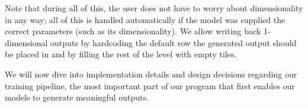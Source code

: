 Note that during all of this, the user does not have to worry about
dimensionality in any way; all of this is handled automatically if the
model was supplied the correct parameters (such as its
dimensionality). We allow writing back 1-dimensional outputs by
hardcoding the default row the generated output should be placed in
and by filling the rest of the level with empty tiles.

We will now dive into implementation details and design decisions
regarding our training pipeline, the most important part of our
program that first enables our models to generate meaningful outputs.



